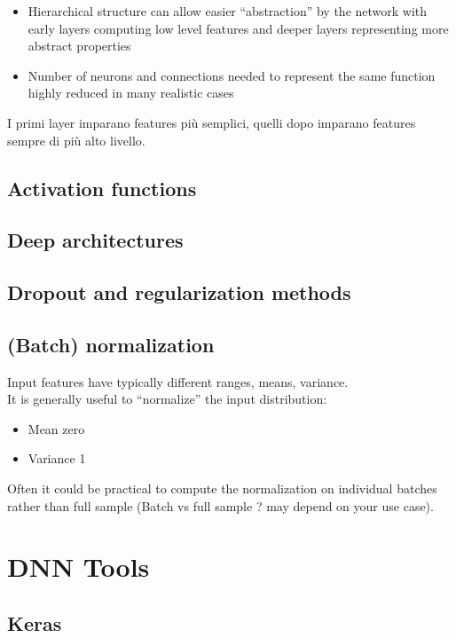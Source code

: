\begin{itemize}
	\item Hierarchical structure can allow easier “abstraction” by the network with early layers computing low level features and deeper layers representing more abstract properties 
	\item Number of neurons and connections needed to represent the same function highly reduced in many realistic cases
\end{itemize}
I primi layer imparano features più semplici, quelli dopo imparano features sempre di più alto livello.

\subsection{Activation functions}
\subsection{Deep architectures}


\subsection{Dropout and regularization methods}

\subsection{(Batch) normalization}
Input features have typically different ranges, means, variance.\\
It is generally useful to “normalize” the input distribution:\\
\begin{itemize}
	\item Mean zero
	\item Variance 1
\end{itemize}

Often it could be practical to compute the normalization on individual batches rather than full sample (Batch vs full sample ? may depend on your use case).

\section{DNN Tools}

\subsection{Keras}

